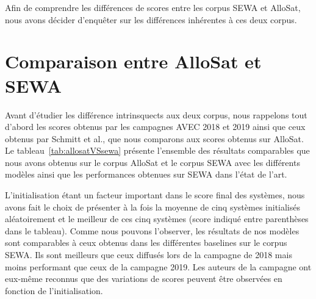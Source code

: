 Afin de comprendre les différences de scores entre les corpus SEWA et AlloSat, nous avons décider d'enquêter sur les différences inhérentes à ces deux corpus.

\section{Comparaison entre AlloSat et SEWA}
Avant d'étudier les différence intrinsquects aux deux corpus, nous rappelons tout d'abord les scores obtenus par les campagnes AVEC 2018 et 2019 ainsi que ceux obtenus par Schmitt et al., que nous comparons aux scores obtenus sur AlloSat. Le tableau~\ref{tab:allosatVSsewa} présente l'ensemble des résultats comparables que nous avons obtenus sur le corpus AlloSat et le corpus SEWA avec les différents modèles ainsi que les performances obtenues sur SEWA dans l'état de l'art.
%
%



 L'initialisation étant un facteur important dans le score final des systèmes, nous avons fait le choix de présenter à la fois la moyenne de cinq systèmes initialisés aléatoirement et le meilleur de ces cinq systèmes (score indiqué entre parenthèses dans le tableau). Comme nous pouvons l'observer, les résultats de nos modèles sont comparables à ceux obtenus dans les différentes baselines sur le corpus SEWA. Ils sont meilleurs que ceux diffusés lors de la campagne de 2018 mais moins performant que ceux de la campagne 2019. Les auteurs de la campagne ont eux-même reconnus que des variations de scores peuvent être observées en fonction de l'initialisation.

